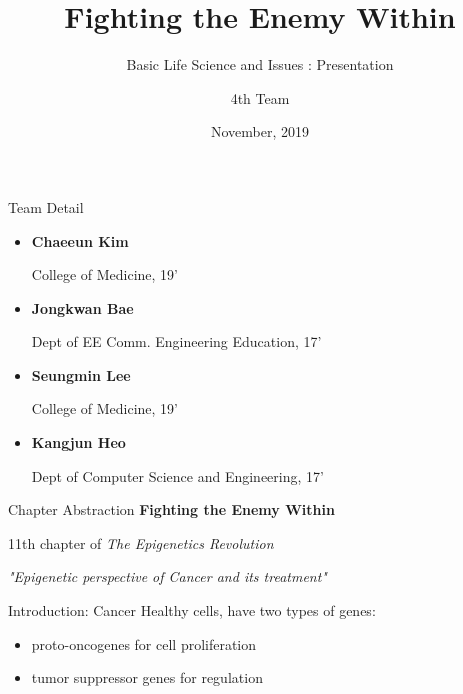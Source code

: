 \documentclass{beamer}
\title{Fighting the Enemy Within}
\subtitle{Basic Life Science and Issues : Presentation}
\author{4th Team}
\institute{Chungnam National University}
\date{November, 2019}
\begin{document}
    \begin{frame}[plain]{ }
        \maketitle
    \end{frame}

    \begin{frame}{Team Detail}
        \begin{itemize}
            \item \textbf{Chaeeun Kim}

                  College of Medicine, 19'
            \item \textbf{Jongkwan Bae} 
            
                  Dept of EE Comm. Engineering Education, 17'
            \item \textbf{Seungmin Lee}
            
                  College of Medicine, 19'
            \item \textbf{Kangjun Heo}
            
                  Dept of Computer Science and Engineering, 17'
        \end{itemize}
    \end{frame}

    \begin{frame}{Chapter Abstraction}
        \textbf{Fighting the Enemy Within}
        
        11th chapter of \textit{The Epigenetics Revolution}

        \vspace{2.5em}

        \textit{"Epigenetic perspective of Cancer and its treatment"}
    \end{frame}

    \begin{frame}{Introduction: Cancer}
        Healthy cells, have two types of genes:
        \begin{itemize}
            \item proto-oncogenes for cell proliferation
            \item tumor suppressor genes for regulation
        \end{itemize}
    \end{frame}
\end{document}
